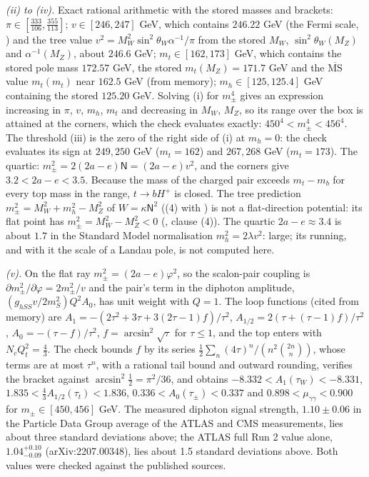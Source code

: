 \emph{(ii) to (iv).} Exact rational arithmetic with the stored masses and brackets: $\pi \in [\tfrac{333}{106}, \tfrac{355}{113}]$; $v \in [246, 247]$ GeV, which contains $246.22$ GeV (the Fermi scale, ) and the tree value $v^{2} = M_{W}^{2}\sin^{2}\theta_{W}\alpha^{-1}/\pi$ from the stored $M_{W}$, $\sin^{2}\theta_{W}(M_{Z})$ and $\alpha^{-1}(M_{Z})$, about $246.6$ GeV; $m_{t} \in [162, 173]$ GeV, which contains the stored pole mass $172.57$ GeV, the stored $m_{t}(M_{Z}) = 171.7$ GeV and the $\overline{\mathrm{MS}}$ value $m_{t}(m_{t})$ near $162.5$ GeV (from memory); $m_{h} \in [125, 125.4]$ GeV containing the stored $125.20$ GeV. Solving (i) for $m_{\pm}^{4}$ gives an expression increasing in $\pi$, $v$, $m_{h}$, $m_{t}$ and decreasing in $M_{W}$, $M_{Z}$, so its range over the box is attained at the corners, which the check evaluates exactly: $450^{4} < m_{\pm}^{4} < 456^{4}$. The threshold (iii) is the zero of the right side of (i) at $m_{h} = 0$: the check evaluates its sign at $249, 250$ GeV ($m_{t} = 162$) and $267, 268$ GeV ($m_{t} = 173$). The quartic: $m_{\pm}^{2} = 2(2a - e)\mathsf{N} = (2a - e)v^{2}$, and the corners give $3.2 < 2a - e < 3.5$. Because the mass of the charged pair exceeds $m_{t} - m_{b}$ for every top mass in the range, $t \to bH^{+}$ is closed. The tree prediction $m_{\pm}^{2} = M_{W}^{2} + m_{h}^{2} - M_{Z}^{2}$ of $W = \kappa \mathsf{N}^{2}$ ((4) with ) is not a flat-direction potential: its flat point has $m_{\pm}^{2} = M_{W}^{2} - M_{Z}^{2} < 0$ (, clause (4)). The quartic $2a - e \approx 3.4$ is about $1.7$ in the Standard Model normalisation $m_{h}^{2} = 2\lambda v^{2}$: large; its running, and with it the scale of a Landau pole, is not computed here.

\emph{(v).} On the flat ray $m_{\pm}^{2} = (2a - e)\varphi^{2}$, so the scalon-pair coupling is $\partial m_{\pm}^{2}/\partial\varphi = 2m_{\pm}^{2}/v$ and the pair's term in the diphoton amplitude, $(g_{hSS}v/2m_{S}^{2})Q^{2}A_{0}$, has unit weight with $Q = 1$. The loop functions (cited from memory) are $A_{1} = -(2\tau^{2} + 3\tau + 3(2\tau - 1)f)/\tau^{2}$, $A_{1/2} = 2(\tau + (\tau - 1)f)/\tau^{2}$, $A_{0} = -(\tau - f)/\tau^{2}$, $f = \arcsin^{2}\sqrt{\tau}$ for $\tau \le 1$, and the top enters with $N_{c}Q_{t}^{2} = \tfrac43$. The check bounds $f$ by its series $\tfrac12\sum_{n}(4\tau)^{n}/(n^{2}\binom{2n}{n})$, whose terms are at most $\tau^{n}$, with a rational tail bound and outward rounding, verifies the bracket against $\arcsin^{2}\tfrac12 = \pi^{2}/36$, and obtains $-8.332 < A_{1}(\tau_{W}) < -8.331$, $1.835 < \tfrac43 A_{1/2}(\tau_{t}) < 1.836$, $0.336 < A_{0}(\tau_{\pm}) < 0.337$ and $0.898 < \mu_{\gamma\gamma} < 0.900$ for $m_{\pm} \in [450, 456]$ GeV. The measured diphoton signal strength, $1.10 \pm 0.06$ in the Particle Data Group average of the ATLAS and CMS measurements, lies about three standard deviations above; the ATLAS full Run 2 value alone, $1.04^{+0.10}_{-0.09}$ (arXiv:2207.00348), lies about 1.5 standard deviations above. Both values were checked against the published sources.

